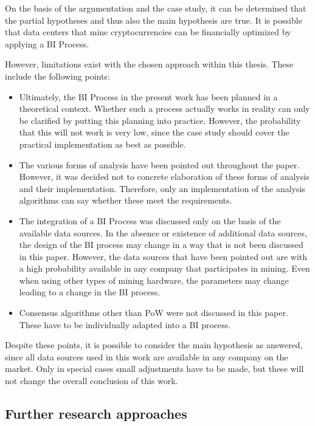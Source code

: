 On the basis of the argumentation and the case study, it can be determined that the partial hypotheses and thus also the main hypothesis are
true. It is possible that data centers that mine cryptocurrencies can be financially optimized by applying a \ac{BI}
Process.

However, limitations exist with the chosen approach within this thesis. These include the following points:
\begin{itemize}
    \item Ultimately, the \ac{BI} Process in the present work has been planned in a theoretical context. Whether such a
    process actually works in reality can only be clarified by putting this planning into practice.
    However, the probability that this will not work is very low, since the case study
    should cover the practical implementation as best as possible.
    \item The various forms of analysis have been pointed out throughout the paper. However, it was decided not to
    concrete elaboration of these forms of analysis and their implementation. Therefore, only an implementation of the
    analysis algorithms can say whether these meet the requirements.
    \item The integration of a \ac{BI} Process was discussed only on the basis of the available data sources. In the absence
    or existence of additional data sources, the design of the \ac{BI} process may change in a way that is not
    been discussed in this paper. However, the data sources that have been pointed out are with a
    high probability available in any company that participates in mining. Even when using other
    types of mining hardware, the parameters may change leading to a change in the \ac{BI} process.
    \item Consensus algorithms other than \ac{PoW} were not discussed in this paper. These have to be individually adapted
    into a \ac{BI} process.
\end{itemize}

Despite these points, it is possible to consider the main hypothesis as answered, since all data sources used in this work are available in any company on the market.
Only in special cases small adjustments have to be made, but these will not change the overall conclusion of this work.

\subsection{Further research approaches} \label{toc:ausblick}

